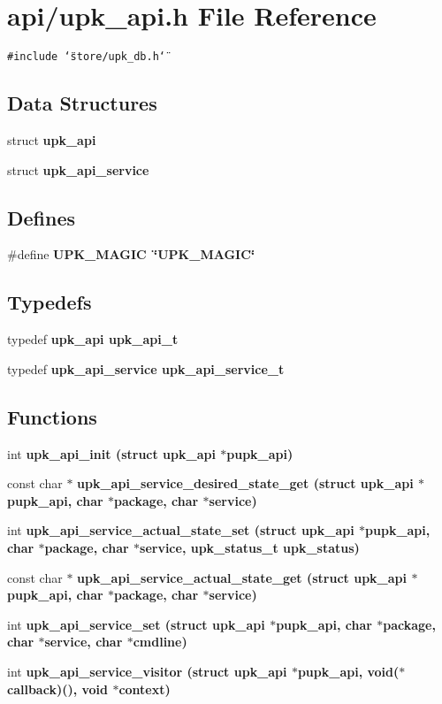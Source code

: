 \section{api/upk\_\-api.h File Reference}
\label{upk__api_8h}
{\tt \#include \char`\"{}store/upk\_\-db.h\char`\"{}}\par
\subsection*{Data Structures}
\begin{CompactItemize}
\item 
struct \bf{upk\_\-api}
\item 
struct \bf{upk\_\-api\_\-service}
\end{CompactItemize}
\subsection*{Defines}
\begin{CompactItemize}
\item 
\#define \bf{UPK\_\-MAGIC}~\char`\"{}UPK\_\-MAGIC\char`\"{}
\end{CompactItemize}
\subsection*{Typedefs}
\begin{CompactItemize}
\item 
typedef \bf{upk\_\-api} \bf{upk\_\-api\_\-t}
\item 
typedef \bf{upk\_\-api\_\-service} \bf{upk\_\-api\_\-service\_\-t}
\end{CompactItemize}
\subsection*{Functions}
\begin{CompactItemize}
\item 
int \bf{upk\_\-api\_\-init} (struct \bf{upk\_\-api} $\ast$pupk\_\-api)
\item 
const char $\ast$ \bf{upk\_\-api\_\-service\_\-desired\_\-state\_\-get} (struct \bf{upk\_\-api} $\ast$pupk\_\-api, char $\ast$package, char $\ast$service)
\item 
int \bf{upk\_\-api\_\-service\_\-actual\_\-state\_\-set} (struct \bf{upk\_\-api} $\ast$pupk\_\-api, char $\ast$package, char $\ast$service, upk\_\-status\_\-t upk\_\-status)
\item 
const char $\ast$ \bf{upk\_\-api\_\-service\_\-actual\_\-state\_\-get} (struct \bf{upk\_\-api} $\ast$pupk\_\-api, char $\ast$package, char $\ast$service)
\item 
int \bf{upk\_\-api\_\-service\_\-set} (struct \bf{upk\_\-api} $\ast$pupk\_\-api, char $\ast$package, char $\ast$service, char $\ast$cmdline)
\item 
int \bf{upk\_\-api\_\-service\_\-visitor} (struct \bf{upk\_\-api} $\ast$pupk\_\-api, void($\ast$callback)(), void $\ast$context)
\end{CompactItemize}


